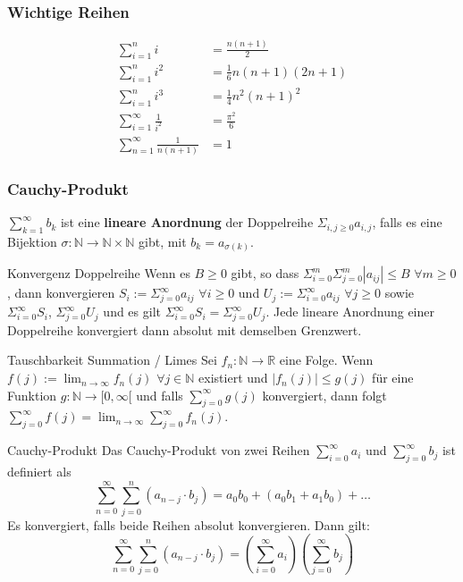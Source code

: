 \documentclass[a4paper,10pt]{article}
\def\limn{\lim_{n\to \infty}}
\def\sumk{\sum_{k=1}^\infty}
\begin{document}
\subsubsection{Wichtige Reihen}
\begin{align*}
 \sum_{i=1}^n i &= \frac{n(n+1)}{2} \\
 \sum_{i=1}^n i^2 &= \frac{1}{6}n(n+1)(2n+1) \\
 \sum_{i=1}^n i^3 &= \frac{1}{4}n^2(n+1)^2 \\
 \sum_{i=1}^\infty \frac{1}{i^2} &= \frac{\pi^2}{6} \\
 \sum_{n=1}^\infty \frac{1}{n(n+1)} &= 1
\end{align*}

\subsubsection{Cauchy-Produkt}
$\sumk b_k$ ist eine \textbf{lineare Anordnung} der Doppelreihe $\Sigma_{i,j \geq 0} a_{i,j}$, falls es eine Bijektion $\sigma : \mathbb{N} \rightarrow \mathbb{N} \times \mathbb{N}$ gibt, mit $b_k = a_{\sigma(k)}$.\\

\begin{subbox}{Konvergenz Doppelreihe}
  Wenn es $B \geq 0$ gibt, so dass $\Sigma_{i=0}^m \Sigma_{j=0}^m |a_{ij}| \leq B$ $\forall m \geq 0$, dann konvergieren $S_i := \Sigma_{j=0}^\infty a_{ij}$ $\forall i \geq 0$ und $U_j := \Sigma_{i=0}^\infty a_{ij}$ $\forall j \geq 0$ sowie $\Sigma_{i=0}^\infty S_i$, $\Sigma_{j=0}^\infty U_j$ und es gilt $\Sigma_{i=0}^\infty S_i = \Sigma_{j=0}^\infty U_j$. Jede lineare Anordnung einer Doppelreihe konvergiert dann absolut mit demselben Grenzwert.
\end{subbox}

\begin{subbox}{Tauschbarkeit Summation / Limes}
  Sei $f_n : \mathbb{N} \rightarrow \mathbb{R}$ eine Folge. Wenn $f(j) := \limn f_n(j)$ $\forall j \in \mathbb{N}$ existiert und $|f_n(j)| \leq g(j)$ für eine Funktion $g: \mathbb{N} \rightarrow \mathbb [0, \infty[$ und falls $\sum_{j=0}^\infty g(j)$ konvergiert, dann folgt $\sum_{j=0}^\infty f(j) = \limn \sum_{j=0}^\infty f_n(j)$.
\end{subbox}

\begin{mainbox}{Cauchy-Produkt}
  Das Cauchy-Produkt von zwei Reihen $\sum_{i = 0}^\infty a_i$ und $\sum_{j = 0}^\infty b_j$ ist definiert als
  $$\sum_{n=0}^\infty \sum_{j=0}^n (a_{n-j} \cdot b_j) = a_0b_0 + (a_0b_1 + a_1b_0) + \ldots$$ Es konvergiert, falls beide Reihen absolut konvergieren. Dann gilt:\\
  $$\sum_{n=0}^\infty \sum_{j=0}^n (a_{n-j} \cdot b_j) = (\sum_{i=0}^\infty a_i) (\sum_{j=0}^\infty b_j)$$
\end{mainbox}
\end{document}
